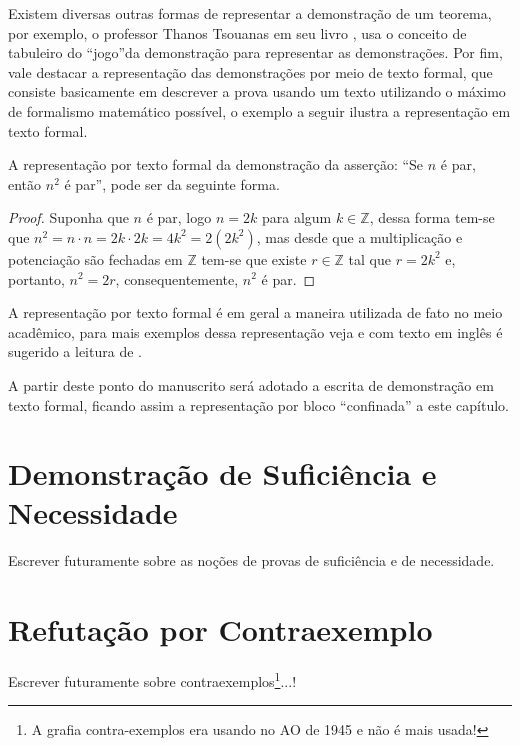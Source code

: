Existem diversas outras formas de representar a demonstração de um teorema, por exemplo, o professor Thanos Tsouanas em seu livro \cite{fmcbook}, usa o conceito de tabuleiro do ``jogo''da demonstração para representar as demonstrações. Por fim, vale destacar a representação das demonstrações por meio de texto formal, que consiste basicamente em descrever a prova usando um texto utilizando o máximo de formalismo matemático possível, o exemplo a seguir ilustra a representação em texto formal.

\begin{example}
	A representação por texto formal da demonstração da asserção: ``Se $n$ é par, então $n^2$ é par'', pode ser da seguinte forma.
	\begin{proof}
		Suponha que $n$ é par, logo $n = 2k$ para algum $k \in \mathbb{Z}$, dessa forma tem-se que $n^2 = n \cdot n = 2k \cdot 2k = 4k^2 = 2(2k^2)$, mas desde que a multiplicação e potenciação são fechadas em $\mathbb{Z}$ tem-se que existe $r \in \mathbb{Z}$ tal que $r = 2k^2$ e, portanto, $n^2 = 2r$, consequentemente,  $n^2$ é par.
	\end{proof}
\end{example}

A representação por texto formal é em geral a maneira utilizada de fato no meio acadêmico, para mais exemplos dessa representação veja \cite{valdi2016master, valdi2020phd, annax2019phd, thadeu2021phd, rui2019phd} e com texto em inglês é sugerido a leitura de \cite{vania2019phd}.

\begin{remark}
	A partir deste ponto do manuscrito será adotado a escrita de demonstração em texto formal, ficando assim a representação por bloco ``confinada'' a este capítulo.
\end{remark}

\section{Demonstração de Suficiência e Necessidade}

Escrever futuramente sobre as noções de provas de suficiência e de necessidade.

\section{Refutação por Contraexemplo}

Escrever futuramente sobre contraexemplos\footnote{A grafia contra-exemplos era usando no AO de 1945 e não é mais usada!}...!

